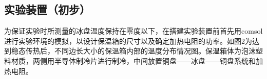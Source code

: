 \documentclass{article}
\begin{document}
\subsection{实验装置（初步）}
为保证实验时所测量的冰盘温度保持在零度以下，在搭建实验装置前首先用comsol进行实验环境的模拟，以设计保温箱的尺寸以及确定加热电阻的功率。如图2为达到稳态传热后，不同边长大小的保温箱内部的温度分布情况图。保温箱体为泡沫塑料材质，两侧用半导体制冷片进行制冷，中间放置铜盘——冰盘——铜盘系统和加热电阻。
 \begin{figure}
	\centering
	  

\end{figure}
\end{document}
